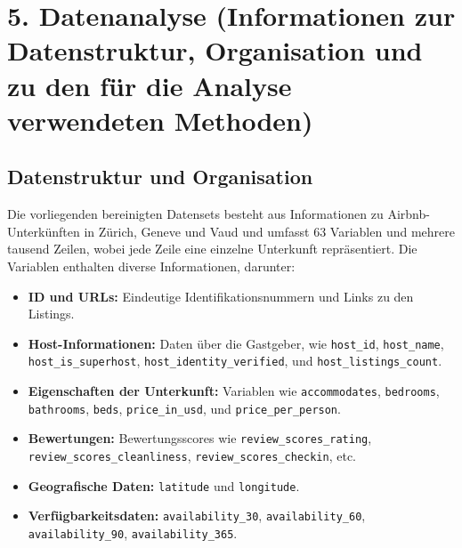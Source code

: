 \documentclass[
  journal,
]{IEEEtran}%
\begin{document}
\section{5. Datenanalyse (Informationen zur Datenstruktur, Organisation
und zu den für die Analyse verwendeten
Methoden)}\label{datenanalyse-informationen-zur-datenstruktur-organisation-und-zu-den-fuxfcr-die-analyse-verwendeten-methoden}

\subsection{Datenstruktur und
Organisation}\label{datenstruktur-und-organisation}

Die vorliegenden bereinigten Datensets besteht aus Informationen zu
Airbnb-Unterkünften in Zürich, Geneve und Vaud und umfasst 63 Variablen
und mehrere tausend Zeilen, wobei jede Zeile eine einzelne Unterkunft
repräsentiert. Die Variablen enthalten diverse Informationen, darunter:

\begin{itemize}
\item
  \textbf{ID und URLs:} Eindeutige Identifikationsnummern und Links zu
  den Listings.
\item
  \textbf{Host-Informationen:} Daten über die Gastgeber, wie
  \texttt{host\_id}, \texttt{host\_name}, \texttt{host\_is\_superhost},
  \texttt{host\_identity\_verified}, und \texttt{host\_listings\_count}.
\item
  \textbf{Eigenschaften der Unterkunft:} Variablen wie
  \texttt{accommodates}, \texttt{bedrooms}, \texttt{bathrooms},
  \texttt{beds}, \texttt{price\_in\_usd}, und
  \texttt{price\_per\_person}.
\item
  \textbf{Bewertungen:} Bewertungsscores wie
  \texttt{review\_scores\_rating}, \texttt{review\_scores\_cleanliness},
  \texttt{review\_scores\_checkin}, etc.
\item
  \textbf{Geografische Daten:} \texttt{latitude} und \texttt{longitude}.
\item
  \textbf{Verfügbarkeitsdaten:} \texttt{availability\_30},
  \texttt{availability\_60}, \texttt{availability\_90},
  \texttt{availability\_365}.
\end{itemize}
\end{document}
